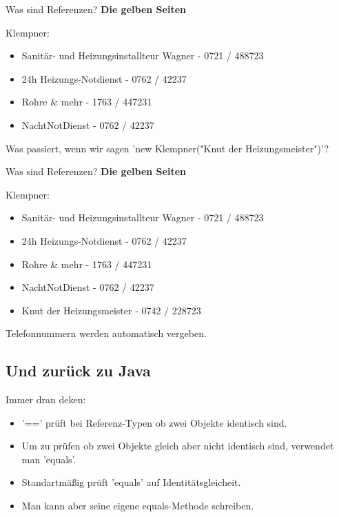 \documentclass[18pt]{beamer}
\begin{document}


\begin{frame}{Was sind Referenzen?}
	\textbf{Die gelben Seiten}
	
	Klempner: 
	\begin{itemize}
		\item Sanitär- und Heizungsinstallteur Wagner - 0721 / 488723
		\item 24h Heizungs-Notdienst - 0762 / 42237
		\item Rohre \& mehr - 1763 / 447231
		\item NachtNotDienst - 0762 / 42237
	\end{itemize}
	
	Was passiert, wenn wir sagen 'new Klempner("Knut der Heizungsmeister")'?
\end{frame}


\begin{frame}{Was sind Referenzen?}
	\textbf{Die gelben Seiten}
	
	Klempner: 
	\begin{itemize}
		\item Sanitär- und Heizungsinstallteur Wagner - 0721 / 488723
		\item 24h Heizungs-Notdienst - 0762 / 42237
		\item Rohre \& mehr - 1763 / 447231
		\item NachtNotDienst - 0762 / 42237
		\item Knut der Heizungsmeister - 0742 / 228723
	\end{itemize}
	
	Telefonnummern werden automatisch vergeben.
\end{frame}


\subsection{Und zurück zu Java}
\begin{frame}{Immer dran deken:}
	\begin{itemize}
		\item '==' prüft bei Referenz-Typen ob zwei Objekte identisch sind.
		\item Um zu prüfen ob zwei Objekte gleich aber nicht identisch sind, verwendet man 'equals'.\pause
		\item Standartmäßig prüft 'equals' auf Identitätsgleicheit.
		\item Man kann aber seine eigene equals-Methode schreiben.
	\end{itemize}
\end{frame}
\end{document}
